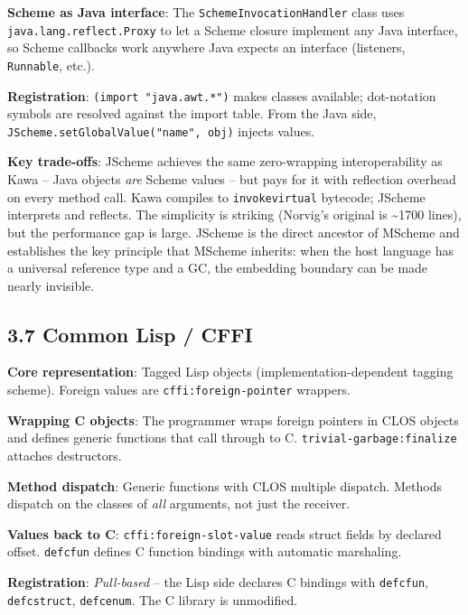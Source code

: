 \documentclass[
  12pt,
]{report}
\newcommand{\passthrough}[1]{#1}
\begin{document}
\textbf{Scheme as Java interface}: The
\passthrough{\lstinline!SchemeInvocationHandler!} class uses
\passthrough{\lstinline!java.lang.reflect.Proxy!} to let a Scheme
closure implement any Java interface, so Scheme callbacks work anywhere
Java expects an interface (listeners,
\passthrough{\lstinline!Runnable!}, etc.).

\textbf{Registration}: \passthrough{\lstinline!(import "java.awt.*")!}
makes classes available; dot-notation symbols are resolved against the
import table. From the Java side,
\passthrough{\lstinline!JScheme.setGlobalValue("name", obj)!} injects
values.

\textbf{Key trade-offs}: JScheme achieves the same zero-wrapping
interoperability as Kawa -- Java objects \emph{are} Scheme values -- but
pays for it with reflection overhead on every method call. Kawa compiles
to \passthrough{\lstinline!invokevirtual!} bytecode; JScheme interprets
and reflects. The simplicity is striking (Norvig's original is
\textasciitilde1700 lines), but the performance gap is large. JScheme is
the direct ancestor of MScheme and establishes the key principle that
MScheme inherits: when the host language has a universal reference type
and a GC, the embedding boundary can be made nearly invisible.

\subsection{3.7 Common Lisp / CFFI}\label{common-lisp-cffi}

\textbf{Core representation}: Tagged Lisp objects
(implementation-dependent tagging scheme). Foreign values are
\passthrough{\lstinline!cffi:foreign-pointer!} wrappers.

\textbf{Wrapping C objects}: The programmer wraps foreign pointers in
CLOS objects and defines generic functions that call through to C.
\passthrough{\lstinline!trivial-garbage:finalize!} attaches destructors.

\textbf{Method dispatch}: Generic functions with CLOS multiple dispatch.
Methods dispatch on the classes of \emph{all} arguments, not just the
receiver.

\textbf{Values back to C}:
\passthrough{\lstinline!cffi:foreign-slot-value!} reads struct fields by
declared offset. \passthrough{\lstinline!defcfun!} defines C function
bindings with automatic marshaling.

\textbf{Registration}: \emph{Pull-based} -- the Lisp side declares C
bindings with \passthrough{\lstinline!defcfun!},
\passthrough{\lstinline!defcstruct!},
\passthrough{\lstinline!defcenum!}. The C library is unmodified.
\end{document}
